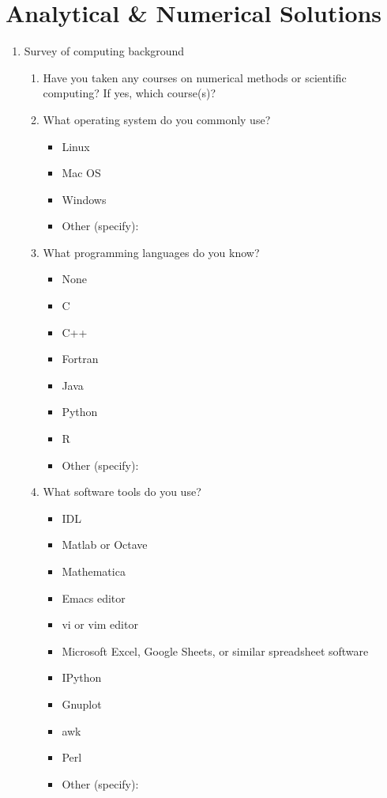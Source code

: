 \documentclass{article}
\begin{document}
\section{Analytical \& Numerical Solutions}
\begin{enumerate}

\item  Survey of computing background
\begin{enumerate}
\item
Have you taken any courses on numerical methods or scientific computing? If yes, which course(s)?

\vspace{4em}


\item
What operating system do you commonly use?
\begin{itemize}
\renewcommand{\labelitemi}{$\square$} 
    \item Linux
    \item Mac OS
    \item Windows
    \item Other (specify):
\end{itemize}

\item
What programming languages do you know?
\begin{itemize}
\renewcommand{\labelitemi}{$\square$} 
    \item None
    \item C
    \item C++
    \item Fortran
    \item Java    
    \item Python
    \item R
    \item Other (specify): 
\end{itemize}

\item
What software tools do you use?
\begin{itemize}
\renewcommand{\labelitemi}{$\square$} 
    \item IDL
    \item Matlab or Octave
    \item Mathematica
    \item Emacs editor
    \item vi or vim editor
    \item Microsoft Excel, Google Sheets, or similar spreadsheet software
    \item IPython
    \item Gnuplot
    \item awk
    \item Perl
    \item Other (specify):
\end{itemize}

\end{enumerate} 
\end{enumerate}
\end{document}

